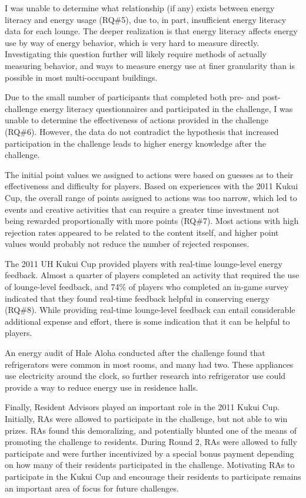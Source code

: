 I was unable to determine what relationship (if any) exists between energy literacy and energy usage (RQ\#5), due to, in part, insufficient energy literacy data for each lounge. The deeper realization is that energy literacy affects energy use by way of energy behavior, which is very hard to measure directly. Investigating this question further will likely require methods of actually measuring behavior, and ways to measure energy use at finer granularity than is possible in most multi-occupant buildings.

Due to the small number of participants that completed both pre- and post-challenge energy literacy questionnaires and participated in the challenge, I was unable to determine the effectiveness of actions provided in the challenge (RQ\#6). However, the data do not contradict the hypothesis that increased participation in the challenge leads to higher energy knowledge after the challenge.

The initial point values we assigned to actions were based on guesses as to their effectiveness and difficulty for players. Based on experiences with the 2011 Kukui Cup, the overall range of points assigned to actions was too narrow, which led to events and creative activities that can require a greater time investment not being rewarded proportionally with more points (RQ\#7). Most actions with high rejection rates appeared to be related to the content itself, and higher point values would probably not reduce the number of rejected responses.

The 2011 UH Kukui Cup provided players with real-time lounge-level energy feedback. Almost a quarter of players completed an activity that required the use of lounge-level feedback, and 74\% of players who completed an in-game survey indicated that they found real-time feedback helpful in conserving energy (RQ\#8). While providing real-time lounge-level feedback can entail considerable additional expense and effort, there is some indication that it can be helpful to players. 

An energy audit of Hale Aloha conducted after the challenge found that refrigerators were common in most rooms, and many had two. These appliances use electricity around the clock, so further research into refrigerator use could provide a way to reduce energy use in residence halls.

Finally, Resident Advisors played an important role in the 2011 Kukui Cup. Initially, RAs were allowed to participate in the challenge, but not able to win prizes. RAs found this demoralizing, and potentially blunted one of the means of promoting the challenge to residents. During Round 2, RAs were allowed to fully participate and were further incentivized by a special bonus payment depending on how many of their residents participated in the challenge. Motivating RAs to participate in the Kukui Cup and encourage their residents to participate remains an important area of focus for future challenges.
